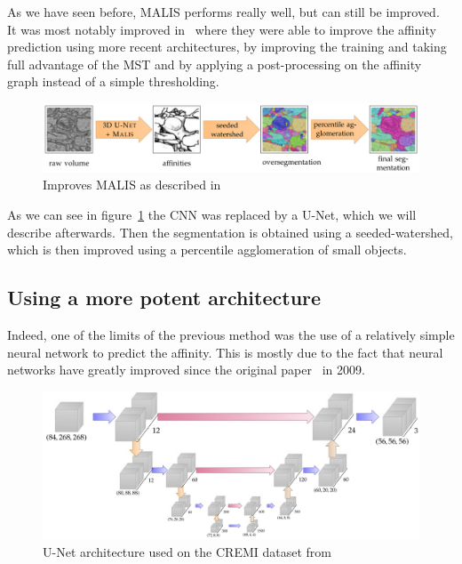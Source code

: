 As we have seen before, MALIS performs really well, but can still be
improved.\\
It was most notably improved in~\cite{funke_large_2019} where they were able to
improve the affinity prediction using more recent architectures, by improving
the training and taking full advantage of the MST and by applying a
post-processing on the affinity graph instead of a simple thresholding.

\begin{figure}[!htbp]
	\centering
	\includegraphics[width=0.8\linewidth]{./images/mala_process.png}
	\caption{Improves MALIS as described in~\cite{funke_large_2019}}%
	\label{fig:mala_process}
\end{figure}

As we can see in figure~\ref{fig:mala_process} the CNN was replaced by a U-Net,
which we will describe afterwards. Then the segmentation is obtained using a
seeded-watershed, which is then improved using a percentile agglomeration of
small objects.

\subsection{Using a more potent architecture}
Indeed, one of the limits of the previous method was the use of a relatively
simple neural network to predict the affinity. This is mostly due to the fact
that neural networks have greatly improved since the original
paper~\cite{turaga_maximin_2009} in 2009.\\

\begin{figure}[!htbp]
	\centering
	\includegraphics[width=0.8\linewidth]{./images/mala_architecture.png}
	\caption{U-Net architecture used on the CREMI dataset from~\cite{funke_large_2019}}%
	\label{fig:mala_unet}
\end{figure}


